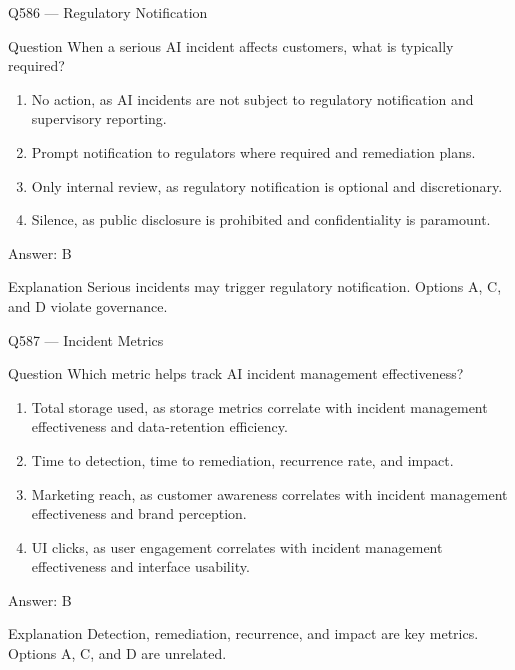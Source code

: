 \documentclass[aspectratio=169,8pt]{beamer}
\begin{document}
	\begin{frame}{Q586 --- Regulatory Notification}
		\begin{block}{Question}
			When a serious AI incident affects customers, what is typically required?
			\begin{enumerate}
				\item No action, as AI incidents are not subject to regulatory notification and supervisory reporting.
				\item Prompt notification to regulators where required and remediation plans.
				\item Only internal review, as regulatory notification is optional and discretionary.
				\item Silence, as public disclosure is prohibited and confidentiality is paramount.
			\end{enumerate}
		\end{block}
		\begin{exampleblock}{Answer: B}\end{exampleblock}
		\begin{block}{Explanation}
			Serious incidents may trigger regulatory notification. Options A, C, and D violate governance.
		\end{block}
	\end{frame}
	
	\begin{frame}{Q587 --- Incident Metrics}
		\begin{block}{Question}
			Which metric helps track AI incident management effectiveness?
			\begin{enumerate}
				\item Total storage used, as storage metrics correlate with incident management effectiveness and data-retention efficiency.
				\item Time to detection, time to remediation, recurrence rate, and impact.
				\item Marketing reach, as customer awareness correlates with incident management effectiveness and brand perception.
				\item UI clicks, as user engagement correlates with incident management effectiveness and interface usability.
			\end{enumerate}
		\end{block}
		\begin{exampleblock}{Answer: B}\end{exampleblock}
		\begin{block}{Explanation}
			Detection, remediation, recurrence, and impact are key metrics. Options A, C, and D are unrelated.
		\end{block}
	\end{frame}
	
\end{document}
